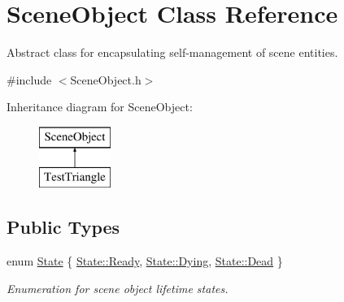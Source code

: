 \hypertarget{class_scene_object}{}\section{Scene\+Object Class Reference}
\label{class_scene_object}


Abstract class for encapsulating self-\/management of scene entities.  




{\ttfamily \#include $<$Scene\+Object.\+h$>$}

Inheritance diagram for Scene\+Object\+:\begin{figure}[H]
\begin{center}
\leavevmode
\includegraphics[height=2.000000cm]{class_scene_object}
\end{center}
\end{figure}
\subsection*{Public Types}
\begin{DoxyCompactItemize}
\item 
enum \hyperlink{class_scene_object_a3e12c3bc61287395d2fb63c370690dc9}{State} \{ \hyperlink{class_scene_object_a3e12c3bc61287395d2fb63c370690dc9ae7d31fc0602fb2ede144d18cdffd816b}{State\+::\+Ready}, 
\hyperlink{class_scene_object_a3e12c3bc61287395d2fb63c370690dc9a2ef54119c1f0d131a1a60e7776fa78f0}{State\+::\+Dying}, 
\hyperlink{class_scene_object_a3e12c3bc61287395d2fb63c370690dc9a183b62c7f067711f9c5a54913c054617}{State\+::\+Dead}
 \}\begin{DoxyCompactList}\small\item\em Enumeration for scene object lifetime states. \end{DoxyCompactList}
\end{DoxyCompactItemize}
